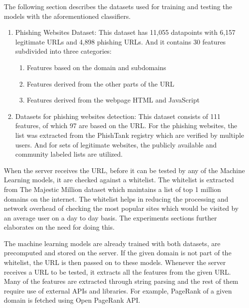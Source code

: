 \documentclass[conference]{IEEEtran}
\begin{document}
\par The following section describes the datasets used for training and testing the models with the aforementioned classifiers.
\begin{enumerate}
    \item Phishing Websites Dataset\cite{UCIDataset}:
          This dataset has 11,055 datapoints with 6,157 legitimate URLs and 4,898 phishing URLs.
          And it contains 30 features subdivided into three categories:
          \begin{enumerate}
              \item Features based on the domain and subdomains
              \item Features derived from the other parts of the URL
              \item Features derived from the webpage HTML and JavaScript
          \end{enumerate}
    \item Datasets for phishing websites detection\cite{GregaDataset}:
          This dataset consists of 111 features, of which 97 are based on the URL.
          For the phishing websites, the list was extracted from the PhishTank registry which are verified by multiple users.
          And for sets of legitimate websites, the publicly available and community labeled lists are utilized\cite{citizenlablists}.
\end{enumerate}

\par When the server receives the URL, before it can be tested by any of the Machine Learning models, it are checked against a whitelist.
The whitelist is extracted from The Majestic Million dataset\cite{MajesticMillion} which maintains a list of top 1 million domains on the internet.
The whitelist helps in reducing the processing and network overhead of checking the most popular sites which would be visited by an average user on a day to day basis. The experiments sections further elaborates on the need for doing this.

\par The machine learning models are already trained with both datasets, are precomputed and stored on the server.
If the given domain is not part of the whitelist, the URL is then passed on to these models.
Whenever the server receives a URL to be tested, it extracts all the features from the given URL.
Many of the features are extracted through string parsing and the rest of them require use of external APIs and libraries.
For example, PageRank of a given domain is fetched using Open PageRank API\cite{OpenPageRank}.
\end{document}
